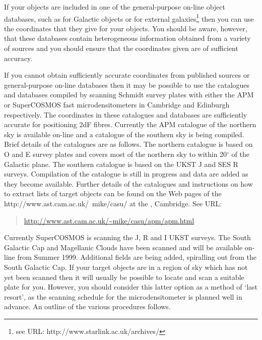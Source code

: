 \documentclass[twoside,11pt]{starlink}
\begin{document}
If your objects are included in one of the general-purpose on-line object
databases, such as
for Galactic objects or
for external galaxies\footnote{see URL:
{http://www.starlink.ac.uk/archives/}} then you can
use the coordinates that they give for your objects.  You should be aware,
however, that these databases contain heterogeneous information obtained
from a variety of sources and you should ensure that the coordinates given
are of sufficient accuracy.

If you cannot obtain sufficiently accurate coordinates from published
sources or general-purpose on-line databases then it may be possible to
use the catalogues and databases compiled by scanning Schmidt survey
plates with either the APM or SuperCOSMOS fast microdensitometers in
Cambridge and Edinburgh respectively.  The coordinates in these catalogues
and databases are sufficiently accurate for positioning 2dF fibres.
Currently the APM catalogue of the northern sky is available on-line
and a catalogue of the southern sky is being compiled.  Brief details
of the catalogues are as follows.  The northern catalogue is based on
O and E survey plates and covers most of the northern sky to within
20$^{\circ}$ of the Galactic plane.  The southern catalogue is based on
the UKST J and SES R  surveys.  Compilation of the catalogue is still in
progress and data are added as they become available.  Further details
of the catalogues and instructions on how to extract lists of target
objects can be found on the Web pages of the
{http://www.ast.cam.ac.uk/~mike/casu/} at the
,
Cambridge.  See URL:

\begin{quote}
\url{http://www.ast.cam.ac.uk/~mike/casu/apm/apm.html}
\end{quote}

Currently SuperCOSMOS is scanning the J, R and I UKST surveys.  The South
Galactic Cap and Magellanic Clouds have been scanned and will be available
on-line from Summer 1999.  Additional fields are being added, spiralling out
from the South Galactic Cap.  If your target objects are in a region of sky
which has not yet been scanned then it will usually be possible to locate and
scan a suitable plate for you.  However, you should consider this latter
option as a method of `last resort', as the scanning schedule for the
microdensitometer is planned well in advance.  An outline of the various
procedures follows.
\end{document}
